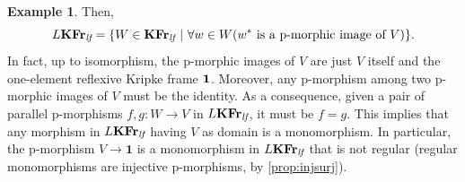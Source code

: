 \documentclass{article}
\theoremstyle{definition}
\newtheorem{example}{Example}
\newcommand{\KFr}{\textup{\textbf{KFr}}}
\newcommand{\lf}{\textit{lf}}
\begin{document}
\begin{example}
Then,
$$L\KFr_\lf = \{W \in \KFr_\lf\ \vert\ \forall w \in W (w^* \text{ is a p-morphic image of } V)\}.$$%
In fact, up to isomorphism, the p-morphic images of $V$ are just $V$ itself and the one-element reflexive Kripke frame $\bf 1$. Moreover, any p-morphism among two p-morphic images of $V$ must be the identity.
As a consequence, given
a pair of parallel p-morphisms $f,g \colon W \longrightarrow V$ in $L\KFr_\lf$, it must be $f=g$.
%
%
This implies that any morphism in $L\KFr_\lf$ having $V$ as domain is a monomorphism. In particular, the p-morphism $V \longrightarrow \mathbf{1}$
is a monomorphism in $L\KFr_\lf$ that is not regular (regular monomorphisms are injective p-morphisms, by \cref{prop:injsurj}).
\end{example}
\end{document}
